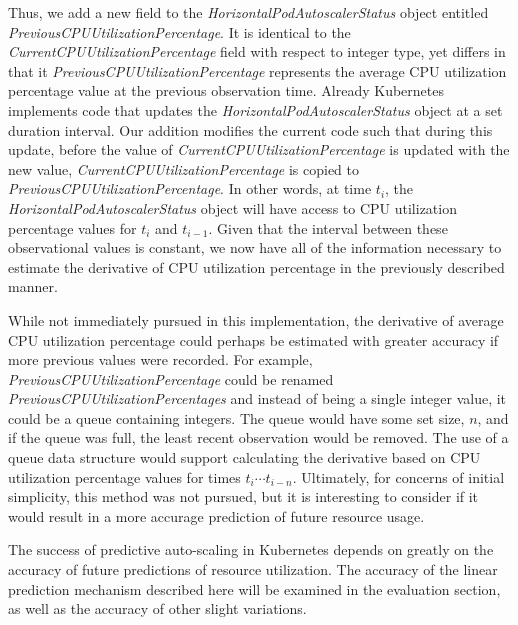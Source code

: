 Thus, we add a new field to the \textit{HorizontalPodAutoscalerStatus} object
entitled \textit{PreviousCPUUtilizationPercentage}. It is identical to the
\textit{CurrentCPUUtilizationPercentage} field with respect to integer type, yet
differs in that it \textit{PreviousCPUUtilizationPercentage} represents the
average CPU utilization percentage value at the previous observation time.
Already Kubernetes implements code that updates the
\textit{HorizontalPodAutoscalerStatus} object at a set duration interval. Our
addition modifies the current code such that during this update, before the value of
\textit{CurrentCPUUtilizationPercentage} is updated with the new value,
\textit{CurrentCPUUtilizationPercentage} is copied to
\textit{PreviousCPUUtilizationPercentage}. In other words, at time
$t_{i}$, the \textit{HorizontalPodAutoscalerStatus} object will have access to
CPU utilization percentage values for $t_{i}$ and $t_{i - 1}$. Given that the
interval between these observational values is constant, we now have all of the
information necessary to estimate the derivative of CPU utilization percentage
in the previously described manner.


While not immediately pursued in this implementation, the derivative of average
CPU utilization percentage could perhaps be estimated with greater accuracy if
more previous values were recorded. For example,
\textit{PreviousCPUUtilizationPercentage} could be renamed
\textit{PreviousCPUUtilizationPercentages} and instead of being a single integer
value, it could be a queue containing integers. The queue would have some set
size, $n$, and if the queue was full, the least recent observation would be
removed. The use of a queue data structure would support calculating the
derivative based on CPU utilization percentage values for times $t_{i} \cdots
t_{i - n}$. Ultimately, for concerns of initial simplicity, this method was not
pursued, but it is interesting to consider if it would result in a more accurage
prediction of future resource usage.

The success of predictive auto-scaling in Kubernetes depends on greatly on the
accuracy of future predictions of resource utilization. The accuracy of the
linear prediction mechanism described here will be examined in the evaluation
section, as well as the accuracy of other slight variations.
